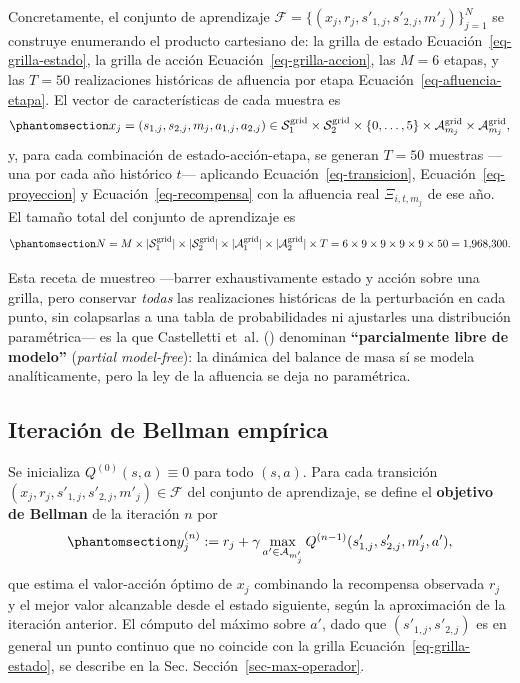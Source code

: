 \documentclass[
  spanish,
  letterpaper,
]{scrreprt}
\theoremstyle{definition}
\theoremstyle{remark}
\begin{document}
Concretamente, el conjunto de aprendizaje
\(\mathcal F=\{(x_j, r_j, s'_{1,j}, s'_{2,j}, m'_j)\}_{j=1}^N\) se
construye enumerando el producto cartesiano de: la grilla de estado
Ecuación~\ref{eq-grilla-estado}, la grilla de acción
Ecuación~\ref{eq-grilla-accion}, las \(M=6\) etapas, y las \(T=50\)
realizaciones históricas de afluencia por etapa
Ecuación~\ref{eq-afluencia-etapa}. El vector de características de cada
muestra es
\begin{equation}\protect\phantomsection\label{eq-caracteristicas}{x_j = (s_{1,j}, s_{2,j}, m_j, a_{1,j}, a_{2,j}) \in \mathcal S_1^{\text{grid}}\times\mathcal S_2^{\text{grid}}\times\{0,\dots,5\}\times\mathcal A^{\text{grid}}_{m_j}\times\mathcal A^{\text{grid}}_{m_j},}\end{equation}
y, para cada combinación de estado-acción-etapa, se generan \(T=50\)
muestras ---una por cada año histórico \(t\)--- aplicando
Ecuación~\ref{eq-transicion}, Ecuación~\ref{eq-proyeccion} y
Ecuación~\ref{eq-recompensa} con la afluencia real \(\Xi_{i,t,m_j}\) de
ese año. El tamaño total del conjunto de aprendizaje es
\begin{equation}\protect\phantomsection\label{eq-tamano-N}{N = M\times|\mathcal S_1^{\text{grid}}|\times|\mathcal S_2^{\text{grid}}|\times|\mathcal A_1^{\text{grid}}|\times|\mathcal A_2^{\text{grid}}|\times T = 6\times9\times9\times9\times9\times50 = 1{,}968{,}300.}\end{equation}

Esta receta de muestreo ---barrer exhaustivamente estado y acción sobre
una grilla, pero conservar \emph{todas} las realizaciones históricas de
la perturbación en cada punto, sin colapsarlas a una tabla de
probabilidades ni ajustarles una distribución paramétrica--- es la que
Castelletti et~al. () denominan
\textbf{``parcialmente libre de modelo''} (\emph{partial model-free}):
la dinámica del balance de masa sí se modela analíticamente, pero la ley
de la afluencia se deja no paramétrica.

\subsection{Iteración de Bellman
empírica}\label{iteraciuxf3n-de-bellman-empuxedrica}

Se inicializa \(Q^{(0)}(s,a) \equiv 0\) para todo \((s,a)\). Para cada
transición \((x_j,r_j,s'_{1,j},s'_{2,j},m'_j)\in\mathcal F\) del
conjunto de aprendizaje, se define el \textbf{objetivo de Bellman} de la
iteración \(n\) por
\begin{equation}\protect\phantomsection\label{eq-objetivo-bellman}{y^{(n)}_j := r_j + \gamma \max_{a'\in\mathcal A_{m_j'}} Q^{(n-1)}(s'_{1,j},s'_{2,j},m_j',a'),}\end{equation}
que estima el valor-acción óptimo de \(x_j\) combinando la recompensa
observada \(r_j\) y el mejor valor alcanzable desde el estado siguiente,
según la aproximación de la iteración anterior. El cómputo del máximo
sobre \(a'\), dado que \((s'_{1,j},s'_{2,j})\) es en general un punto
continuo que no coincide con la grilla Ecuación~\ref{eq-grilla-estado},
se describe en la Sec. Sección~\ref{sec-max-operador}.
\end{document}
